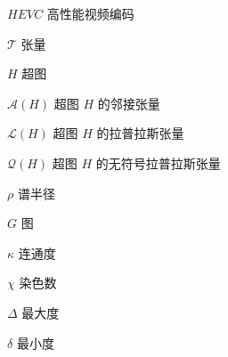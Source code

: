 \begin{denotation}[2.5cm]
    \item[$HEVC$] 高性能视频编码

    \item[$\mathcal{T}$] 张量
    \item[$H$] 超图
    \item[$\mathcal{A}(H)$] 超图 $H$ 的邻接张量
    \item[$\mathcal{L}(H)$] 超图 $H$ 的拉普拉斯张量
    \item[$\mathcal{Q}(H)$] 超图 $H$ 的无符号拉普拉斯张量
    \item[$\rho$] 谱半径
    \item[$G$] 图
    \item[$\kappa$] 连通度
    \item[$\chi$] 染色数
    \item[$\Delta$] 最大度
    \item[$\delta$] 最小度
\end{denotation}
